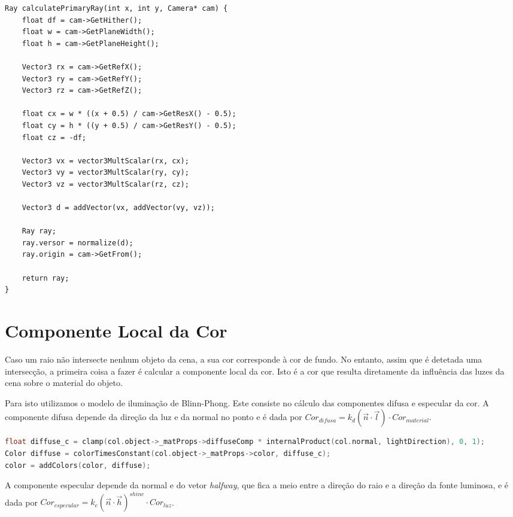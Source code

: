 \documentclass{article}
\begin{document}
\begin{multicols}{2}
\begin{lstlisting}
Ray calculatePrimaryRay(int x, int y, Camera* cam) {
    float df = cam->GetHither();
    float w = cam->GetPlaneWidth();
    float h = cam->GetPlaneHeight();
    
    Vector3 rx = cam->GetRefX();
    Vector3 ry = cam->GetRefY();
    Vector3 rz = cam->GetRefZ();
    
    float cx = w * ((x + 0.5) / cam->GetResX() - 0.5);
    float cy = h * ((y + 0.5) / cam->GetResY() - 0.5);
    float cz = -df;
    
    Vector3 vx = vector3MultScalar(rx, cx);
    Vector3 vy = vector3MultScalar(ry, cy);
    Vector3 vz = vector3MultScalar(rz, cz);
    
    Vector3 d = addVector(vx, addVector(vy, vz));
    
    Ray ray;
    ray.versor = normalize(d);
    ray.origin = cam->GetFrom();
    
    return ray;
}
\end{lstlisting}
    
    \section{Componente Local da Cor}

    Caso um raio não intersecte nenhum objeto da cena, a sua cor corresponde
    à cor de fundo. No entanto, assim que é detetada uma intersecção, a
    primeira coisa a fazer é calcular a componente local da cor. Isto é a cor
    que resulta diretamente da influência das luzes da cena sobre o material
    do objeto.

    Para isto utilizamos o modelo de iluminação de Blinn-Phong. Este consiste no
    cálculo das componentes difusa e especular da cor. A componente difusa depende
    da direção da luz e da normal no ponto e é dada por
    $ Cor_{difusa} = k_d (\vec{n} \cdot \vec{l}) \cdot Cor_{material} $.

\begin{lstlisting}[language=C++]
float diffuse_c = clamp(col.object->_matProps->diffuseComp * internalProduct(col.normal, lightDirection), 0, 1);
Color diffuse = colorTimesConstant(col.object->_matProps->color, diffuse_c);
color = addColors(color, diffuse);
\end{lstlisting}

    A componente especular depende da normal e do vetor \textit{halfway}, que fica a meio
    entre a direção do raio e a direção da fonte luminosa, e é dada por
    $ Cor_{especular} = k_e (\vec{n} \cdot \vec{h})^{shine} \cdot Cor_{luz} $.


\end{multicols}
\end{document}
